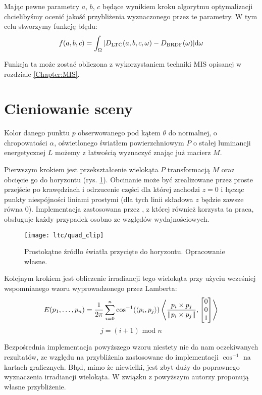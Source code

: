 \documentclass[../main.tex]{subfiles}
\begin{document}
Mając pewne parametry $a$, $b$, $c$ będące wynikiem kroku algorytmu optymalizacji chcielibyśmy ocenić jakość przybliżenia wyznaczonego przez te parametry. W tym celu stworzymy funkcję błędu:
\[
  f(a,b,c) =
    \int_{\Omega} {
      \abs{
        {D_{\text{LTC}}(a, b, c, \omega) - D_{\text{BRDF}}(\omega)}
      }
    } \dd \omega
\]

Funkcja ta może zostać obliczona z wykorzystaniem techniki MIS opisanej w rozdziale \ref{Chapter:MIS}.

\section{Cieniowanie sceny}

Kolor danego punktu $p$ obserwowanego pod kątem $\theta$ do normalnej, o chropowatości $\alpha$, oświetlonego światłem powierzchniowym $P$ o stałej luminancji energetycznej $L$ możemy z łatwością wyznaczyć znając już macierz $M$.

Pierwszym krokiem jest przekształcenie wielokąta $P$ transformacją $M$ oraz obcięcie go do horyzontu (rys. \ref{fig:QuadClip}). Obcinanie może być zrealizowane przez proste przejście po krawędziach i odrzucenie części dla której zachodzi $z=0$ i łącząc punkty niespójności liniami prostymi (dla tych linii składowa $z$ będzie zawsze równa $0$). Implementacja zastosowana przez \cite{ltc_heitz}, z której również korzysta ta praca, obsługuje każdy przypadek osobno ze względów wydajnościowych.

\begin{figure}[h]
    \centering
    \texttt{[image: ltc/quad\_clip]}
    \caption{Prostokątne źródło światła przycięte do horyzontu. Opracowanie własne.}
    \label{fig:QuadClip}
\end{figure}

Kolejnym krokiem jest obliczenie irradiancji tego wielokąta przy użyciu wcześniej wspomnianego wzoru wyprowadzonego przez Lamberta:
\[
E(p_1, \ldots, p_n) =
\frac{1}{2\pi}
\sum_{i=0}^{n} {
    \cos^{-1}(\langle p_i, p_j \rangle)
    \left\langle {
        \frac{p_i \times p_j}{\norm{p_i \times p_j}},
        \left[ \begin{matrix} 0 \\ 0 \\ 1 \end{matrix} \right]
    } \right\rangle
}
\]
\[
j = (i+1) \text{ mod } n
\]

Bezpośrednia implementacja powyższego wzoru niestety nie da nam oczekiwanych rezultatów, ze względu na przybliżenia zastosowane do implementacji $\cos^{-1}$ na kartach graficznych. Błąd, mimo że niewielki, jest zbyt duży do poprawnego wyznaczenia irradiancji wielokąta. W związku z powyższym autorzy \cite{LTCJourneyPresentation} proponują własne przybliżenie.
\end{document}
